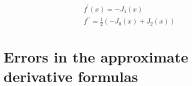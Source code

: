 \documentclass{book}
\theoremstyle{plain}
\theoremstyle{definition}
\numberwithin{exm}{chapter}
\theoremstyle{remark}
\theoremstyle{summary}
\theoremstyle{overview}
\begin{document}
\begin{equation*}
\begin{split}
			f^\prime(x) = -J_1(x)\\
			f^{\prime\prime} = \frac{1}{2}(-J_0(x)+J_2(x))	
			\end{split}
\end{equation*}

\section*{Errors in the approximate derivative formulas}
\end{document}
